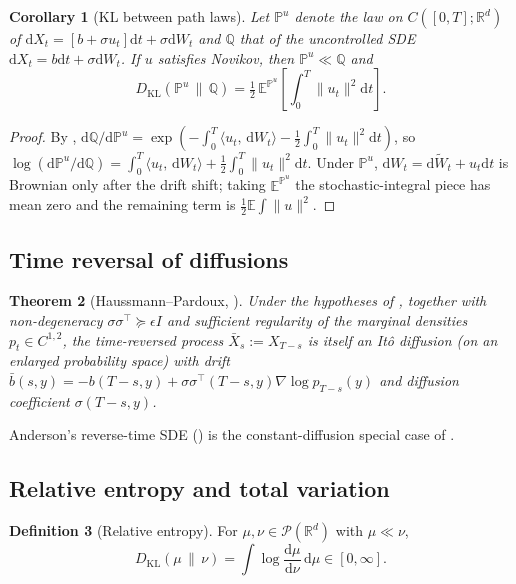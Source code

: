 \documentclass[11pt,letterpaper]{article}
\theoremstyle{plain}
\newtheorem{theorem}{Theorem}[section]
\newtheorem{corollary}[theorem]{Corollary}
\theoremstyle{definition}
\newtheorem{definition}[theorem]{Definition}
\theoremstyle{remark}
\newcommand{\R}{\mathbb{R}}
\newcommand{\E}{\mathbb{E}}
\newcommand{\dd}{\mathrm{d}}
\newcommand{\KL}{D_{\mathrm{KL}}}
\newcommand{\calP}{\mathcal{P}}
\newcommand{\grad}{\nabla}
\newcommand{\inner}[2]{\langle #1,\,#2\rangle}
\newcommand{\norm}[1]{\lVert #1\rVert}
\begin{document}
\begin{corollary}[KL between path laws]\label{cor:kl-sde}
Let $\mathbb{P}^u$ denote the law on $C([0,T];\R^d)$ of
$\dd X_t=[b+\sigma u_t]\dd t+\sigma\dd W_t$ and $\mathbb{Q}$ that of the
uncontrolled SDE $\dd X_t=b\dd t+\sigma\dd W_t$. If $u$ satisfies
Novikov, then $\mathbb{P}^u\ll\mathbb{Q}$ and
\begin{equation}
  \KL(\mathbb{P}^u\,\|\,\mathbb{Q}) = \tfrac12\,\E^{\mathbb{P}^u}\!\left[\!\int_0^T\!\norm{u_t}^2\dd t\right].
  \label{eq:kl-path-app}
\end{equation}
\end{corollary}
\begin{proof}
By ,
$\dd\mathbb{Q}/\dd\mathbb{P}^u=\exp(-\int_0^T\inner{u_t}{\dd W_t}
-\tfrac12\int_0^T\norm{u_t}^2\dd t)$, so
$\log(\dd\mathbb{P}^u/\dd\mathbb{Q})=\int_0^T\inner{u_t}{\dd W_t}+\tfrac12\int_0^T\norm{u_t}^2\dd t$.
Under $\mathbb{P}^u$, $\dd W_t=\dd\widetilde{W}_t+u_t\dd t$ is Brownian only
after the drift shift; taking $\E^{\mathbb{P}^u}$ the stochastic-integral
piece has mean zero and the remaining term is $\tfrac12\E\int\norm{u}^2$.
\end{proof}

\subsection{Time reversal of diffusions}

\begin{theorem}[Haussmann--Pardoux, {\citealt{haussmann1986time}}]\label{thm:hp}
Under the hypotheses of , together with non-degeneracy
$\sigma\sigma^\top\succeq\epsilon I$ and sufficient regularity of the
marginal densities $p_t\in C^{1,2}$, the time-reversed process
$\bar X_s:=X_{T-s}$ is itself an It\^o diffusion (on an enlarged
probability space) with drift
$\bar b(s,y)=-b(T-s,y)+\sigma\sigma^\top(T-s,y)\grad\log p_{T-s}(y)$ and
diffusion coefficient $\sigma(T-s,y)$.
\end{theorem}

Anderson's reverse-time SDE () is the constant-diffusion
special case of .

\subsection{Relative entropy and total variation}

\begin{definition}[Relative entropy]\label{def:kl}
For $\mu,\nu\in\calP(\R^d)$ with $\mu\ll\nu$,
\[
  \KL(\mu\,\|\,\nu)=\int\log\!\frac{\dd\mu}{\dd\nu}\,\dd\mu\in[0,\infty].
\]
\end{definition}
\end{document}
